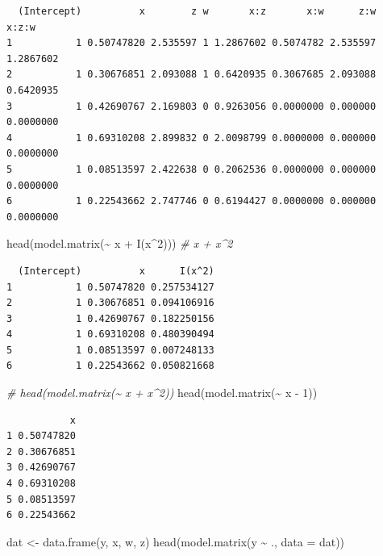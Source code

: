 \documentclass[
  11pt,
]{krantz}
\newenvironment{Shaded}{\begin{snugshade}}{\end{snugshade}}
\newcommand{\AttributeTok}[1]{\textcolor[rgb]{0.61,0.61,0.61}{#1}}
\newcommand{\CommentTok}[1]{\textcolor[rgb]{0.37,0.37,0.37}{\textit{#1}}}
\newcommand{\DecValTok}[1]{\textcolor[rgb]{0.06,0.06,0.06}{#1}}
\newcommand{\FunctionTok}[1]{\textcolor[rgb]{0,0,0}{#1}}
\newcommand{\NormalTok}[1]{#1}
\newcommand{\OtherTok}[1]{\textcolor[rgb]{0.37,0.37,0.37}{#1}}
\newcommand{\SpecialCharTok}[1]{\textcolor[rgb]{0,0,0}{#1}}
\begin{document}
\begin{verbatim}
  (Intercept)          x        z w       x:z       x:w      z:w     x:z:w
1           1 0.50747820 2.535597 1 1.2867602 0.5074782 2.535597 1.2867602
2           1 0.30676851 2.093088 1 0.6420935 0.3067685 2.093088 0.6420935
3           1 0.42690767 2.169803 0 0.9263056 0.0000000 0.000000 0.0000000
4           1 0.69310208 2.899832 0 2.0098799 0.0000000 0.000000 0.0000000
5           1 0.08513597 2.422638 0 0.2062536 0.0000000 0.000000 0.0000000
6           1 0.22543662 2.747746 0 0.6194427 0.0000000 0.000000 0.0000000
\end{verbatim}

\begin{Shaded}
\begin{Highlighting}[]
\FunctionTok{head}\NormalTok{(}\FunctionTok{model.matrix}\NormalTok{(}\SpecialCharTok{\textasciitilde{}}\NormalTok{ x }\SpecialCharTok{+} \FunctionTok{I}\NormalTok{(x}\SpecialCharTok{\^{}}\DecValTok{2}\NormalTok{))) }\CommentTok{\# x + x\^{}2}
\end{Highlighting}
\end{Shaded}

\begin{verbatim}
  (Intercept)          x      I(x^2)
1           1 0.50747820 0.257534127
2           1 0.30676851 0.094106916
3           1 0.42690767 0.182250156
4           1 0.69310208 0.480390494
5           1 0.08513597 0.007248133
6           1 0.22543662 0.050821668
\end{verbatim}

\begin{Shaded}
\begin{Highlighting}[]
\CommentTok{\# head(model.matrix(\textasciitilde{} x + x\^{}2))}
\FunctionTok{head}\NormalTok{(}\FunctionTok{model.matrix}\NormalTok{(}\SpecialCharTok{\textasciitilde{}}\NormalTok{ x }\SpecialCharTok{{-}} \DecValTok{1}\NormalTok{))}
\end{Highlighting}
\end{Shaded}

\begin{verbatim}
           x
1 0.50747820
2 0.30676851
3 0.42690767
4 0.69310208
5 0.08513597
6 0.22543662
\end{verbatim}

\begin{Shaded}
\begin{Highlighting}[]
\NormalTok{dat }\OtherTok{\textless{}{-}} \FunctionTok{data.frame}\NormalTok{(y, x, w, z)}
\FunctionTok{head}\NormalTok{(}\FunctionTok{model.matrix}\NormalTok{(y }\SpecialCharTok{\textasciitilde{}}\NormalTok{ ., }\AttributeTok{data =}\NormalTok{ dat))}
\end{Highlighting}
\end{Shaded}
\end{document}
